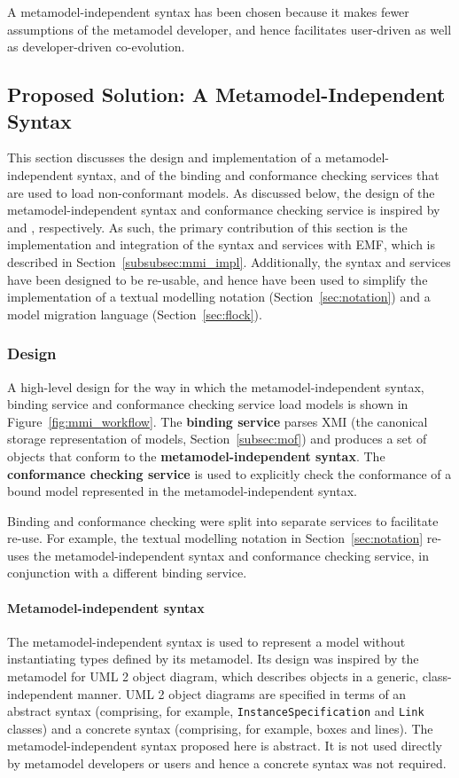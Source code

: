 A metamodel-independent syntax has been chosen because it makes fewer assumptions of the metamodel developer, and hence facilitates user-driven as well as developer-driven co-evolution.


\subsection{Proposed Solution: A Metamodel-Independent Syntax}
\label{subsec:binding}
This section discusses the design and implementation of a metamodel-independent syntax, and of the binding and conformance checking services that are used to load non-conformant models. As discussed below, the design of the metamodel-independent syntax and conformance checking service is inspired by \cite{uml212} and \cite{paige07metamodel}, respectively. As such, the primary contribution of this section is the implementation and integration of the syntax and services with EMF, which is described in Section~\ref{subsubsec:mmi_impl}. Additionally, the syntax and services have been designed to be re-usable, and hence have been used to simplify the implementation of a textual modelling notation (Section~\ref{sec:notation}) and a model migration language (Section~\ref{sec:flock}).

\subsubsection{Design}
A high-level design for the way in which the metamodel-independent syntax, binding service and conformance checking service load models is shown in Figure~\ref{fig:mmi_workflow}. The \textbf{binding service} parses XMI (the canonical storage representation of models, Section~\ref{subsec:mof}) and produces a set of objects that conform to the \textbf{metamodel-independent syntax}. The \textbf{conformance checking service} is used to explicitly check the conformance of a bound model represented in the metamodel-independent syntax.

Binding and conformance checking were split into separate services to facilitate re-use. For example, the textual modelling notation in Section~\ref{sec:notation} re-uses the metamodel-independent syntax and conformance checking service, in conjunction with a different binding service.

\paragraph{Metamodel-independent syntax} The metamodel-independent syntax is used to represent a model without instantiating types defined by its metamodel. Its design was inspired by the metamodel for UML 2 \cite{uml212} object diagram, which describes objects in a generic, class-independent manner. UML 2 object diagrams are specified in terms of an abstract syntax (comprising, for example, \texttt{InstanceSpecification} and \texttt{Link} classes) and a concrete syntax (comprising, for example, boxes and lines). The metamodel-independent syntax proposed here is abstract. It is not used directly by metamodel developers or users and hence a concrete syntax was not required.

